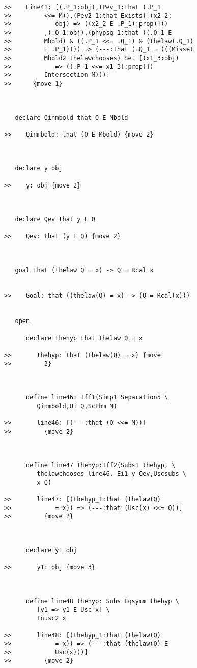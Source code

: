\documentclass[12pt]{article}
\begin{document}
\begin{verbatim}
>>    Line41: [(.P_1:obj),(Pev_1:that (.P_1
>>         <<= M)),(Pev2_1:that Exists([(x2_2:
>>            obj) => ((x2_2 E .P_1):prop)]))
>>         ,(.Q_1:obj),(phypsq_1:that ((.Q_1 E
>>         Mbold) & ((.P_1 <<= .Q_1) & (thelaw(.Q_1)
>>         E .P_1)))) => (---:that (.Q_1 = (((Misset
>>         Mbold2 thelawchooses) Set [(x1_3:obj)
>>            => ((.P_1 <<= x1_3):prop)])
>>         Intersection M)))]
>>      {move 1}



   declare Qinmbold that Q E Mbold

>>    Qinmbold: that (Q E Mbold) {move 2}



   declare y obj

>>    y: obj {move 2}



   declare Qev that y E Q

>>    Qev: that (y E Q) {move 2}



   goal that (thelaw Q = x) -> Q = Rcal x


>>    Goal: that ((thelaw(Q) = x) -> (Q = Rcal(x)))


   open

      declare thehyp that thelaw Q = x

>>       thehyp: that (thelaw(Q) = x) {move
>>         3}



      define line46: Iff1(Simp1 Separation5 \
         Qinmbold,Ui Q,Scthm M)

>>       line46: [(---:that (Q <<= M))]
>>         {move 2}



      define line47 thehyp:Iff2(Subs1 thehyp, \
         thelawchooses line46, Ei1 y Qev,Uscsubs \
         x Q)

>>       line47: [(thehyp_1:that (thelaw(Q)
>>            = x)) => (---:that (Usc(x) <<= Q))]
>>         {move 2}



      declare y1 obj

>>       y1: obj {move 3}



      define line48 thehyp: Subs Eqsymm thehyp \
         [y1 => y1 E Usc x] \
         Inusc2 x

>>       line48: [(thehyp_1:that (thelaw(Q)
>>            = x)) => (---:that (thelaw(Q) E
>>            Usc(x)))]
>>         {move 2}




\end{verbatim}
\end{document}
